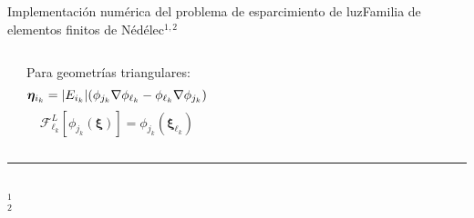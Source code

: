 \begin{frame}{Implementación numérica del problema de esparcimiento de luz}{Familia de elementos finitos de Nédélec$^{1,2}$}
\begin{columns}
\begin{center}
\begin{tikzpicture}[node distance=1em and 1em,font=\footnotesize]
    \end{tikzpicture}
    \end{center}   

\centering
Para geometrías triangulares:
$$\boldsymbol{\eta}_{i_k} = \abs{E_{i_k}} \qty(\phi_{j_k}\nabla\phi_{\ell_k} - \phi_{\ell_k}\nabla\phi_{j_k} )$$
$$\mathcal{F}^{L}_{\ell_k}[\phi_{j_k}(\boldsymbol{\xi})] = \phi_{j_k}(\boldsymbol{\xi}_{\ell_k})$$
\begin{figure}
    \fontsize{4}{5} \selectfont
    \def\svgwidth{1\textwidth}
\end{figure}


\end{columns}
    \vspace*{-.0em}\fontsize{4}{5} \selectfont
   \noindent\rule{.25\textwidth}{0.4pt}\\
	$^1$ \\
	$^2$ 
\end{frame}

